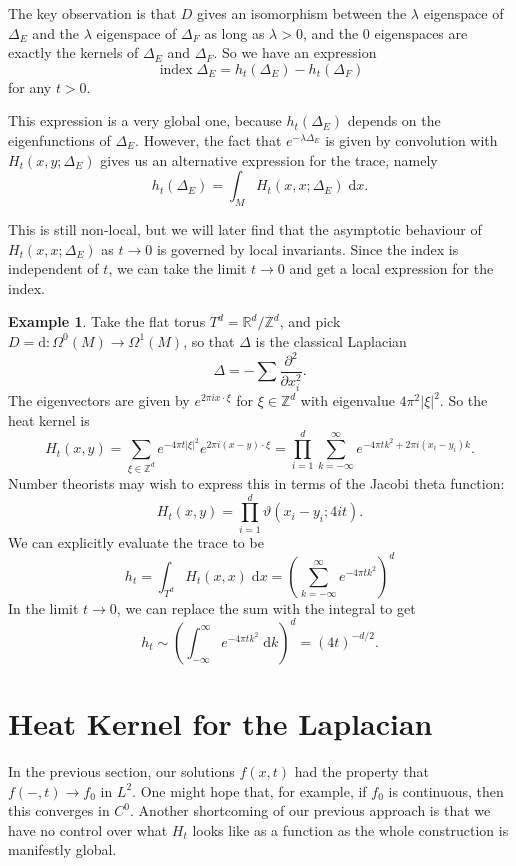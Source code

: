 \documentclass{shortart}
\theoremstyle{definition}
\newtheorem{eg}[thm]{Example}
\newcommand\R{\mathbb{R}}
\newcommand\Z{\mathbb{Z}}
\renewcommand\d{\mathrm{d}}
\DeclareMathOperator\idx{index}
\begin{document}
The key observation is that $D$ gives an isomorphism between the $\lambda$ eigenspace of $\Delta_E$ and the $\lambda$ eigenspace of $\Delta_F$ as long as $\lambda > 0$, and the $0$ eigenspaces are exactly the kernels of $\Delta_E$ and $\Delta_F$. So we have an expression
\[
  \idx \Delta_E = h_t(\Delta_E) - h_t(\Delta_F)
\]
for any $t > 0$.

This expression is a very global one, because $h_t(\Delta_E)$ depends on the eigenfunctions of $\Delta_E$. However, the fact that $e^{-\lambda \Delta_E}$ is given by convolution with $H_t(x, y; \Delta_E)$ gives us an alternative expression for the trace, namely
\[
  h_t(\Delta_E) = \int_M H_t(x, x; \Delta_E)\;\d x.
\]

This is still non-local, but we will later find that the asymptotic behaviour of $H_t(x, x; \Delta_E)$ as $t \to 0$ is governed by local invariants. Since the index is independent of $t$, we can take the limit $t \to 0$ and get a local expression for the index.

\begin{eg}
  Take the flat torus $T^d = \R^d / \Z^d$, and pick $D = \d\colon \Omega^0(M) \to \Omega^1(M)$, so that $\Delta$ is the classical Laplacian
  \[
    \Delta = -\sum \frac{\partial^2}{\partial x_i^2}.
  \]
  The eigenvectors are given by $e^{2\pi ix\cdot \xi}$ for $\xi \in \Z^d$ with eigenvalue $4\pi^2 |\xi|^2$. So the heat kernel is
  \[
    H_t(x, y) = \sum_{\xi \in \Z^d} e^{-4\pi t |\xi|^2} e^{2\pi i(x - y)\cdot \xi} = \prod_{i = 1}^d \sum_{k = -\infty}^\infty e^{-4 \pi t k^2 + 2 \pi i (x_i - y_i) k}.
  \]
  Number theorists may wish to express this in terms of the Jacobi theta function:
  \[
    H_t(x, y) = \prod_{i = 1}^d \vartheta(x_i - y_i; 4it).
  \]
  We can explicitly evaluate the trace to be
  \[
    h_t = \int_{T^d} H_t(x, x) \;\d x = \left(\sum_{k = -\infty}^\infty e^{-4\pi t k^2}\right)^d
  \]
  In the limit $t \to 0$, we can replace the sum with the integral to get
  \[
    h_t \sim \left(\int_{-\infty}^\infty e^{-4\pi t k^2}\;\d k\right)^d = (4t)^{-d/2}.
  \]
\end{eg}

\section{Heat Kernel for the Laplacian}\label{section:heat-kernel-laplacian}
In the previous section, our solutions $f(x, t)$ had the property that $f(-, t) \to f_0$ in $L^2$. One might hope that, for example, if $f_0$ is continuous, then this converges in $C^0$. Another shortcoming of our previous approach is that we have no control over what $H_t$ looks like as a function as the whole construction is manifestly global.
\end{document}
